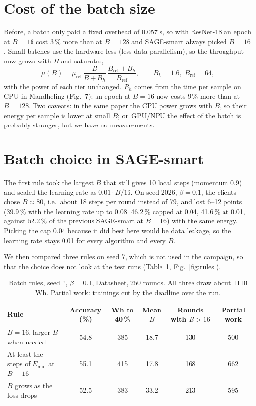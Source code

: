 \documentclass[10pt,a4paper]{article}
\begin{document}
\section{Cost of the batch size}
\label{sec:batch}

Before, a batch only paid a fixed overhead of 0.057 s, so with ResNet-18 an
epoch at $B = 16$ cost 3\,\% more than at $B = 128$ and SAGE-smart always picked
$B = 16$. Small batches use the hardware less (less data parallelism), so the
throughput now grows with $B$ and saturates,
\[
  \mu(B) = \mu_{\mathrm{ref}} \, \frac{B}{B + B_h} \, \frac{B_{\mathrm{ref}} + B_h}{B_{\mathrm{ref}}},
  \qquad B_h = 1.6, \; B_{\mathrm{ref}} = 64,
\]
with the power of each tier unchanged. $B_h$ comes from the time per sample on
CPU in Mandheling (Fig.~7): an epoch at $B = 16$ now costs 9\,\% more than at
$B = 128$. Two caveats: in the same paper the CPU power grows with $B$, so their
energy per sample is lower at small $B$; on GPU/NPU the effect of the batch is
probably stronger, but we have no measurements.

\section{Batch choice in SAGE-smart}
\label{sec:rule}

The first rule took the largest $B$ that still gives 10 local steps (momentum
0.9) and scaled the learning rate as $0.01 \cdot B/16$. On seed 2026, $\beta =
0.1$, the clients chose $B \approx 80$, i.e.\ about 18 steps per round instead of
79, and lost 6--12 points (39.9\,\% with the learning rate up to 0.08, 46.2\,\%
capped at 0.04, 41.6\,\% at 0.01, against 52.2\,\% of the previous SAGE-smart
at $B = 16$) with the same energy. Picking the cap 0.04 because it did best here would be data leakage, so
the learning rate stays 0.01 for every algorithm and every $B$.

We then compared three rules on seed 7, which is not used in the campaign, so
that the choice does not look at the test runs (Table~\ref{tab:rules},
Fig.~\ref{fig:rules}).

\begin{table}[H]
  \centering\small
  \caption{Batch rules, seed 7, $\beta = 0.1$, Datasheet, 250 rounds. All
  three draw about 1110 Wh. Partial work: trainings cut by the deadline over
  the run.}
  \label{tab:rules}
  \begin{tabular}{lccccc}
    \toprule
    Rule & Accuracy (\%) & Wh to 40\,\% & Mean $B$ & Rounds with $B > 16$ & Partial work \\
    \midrule
    $B = 16$, larger $B$ when needed  & 54.8 & 385 & 18.7 & 130 & 500 \\
    At least the steps of $E_{\min}$ at $B = 16$ & 55.1 & 415 & 17.8 & 168 & 662 \\
    $B$ grows as the loss drops       & 52.5 & 383 & 33.2 & 213 & 595 \\
    \bottomrule
  \end{tabular}
\end{table}
\end{document}
